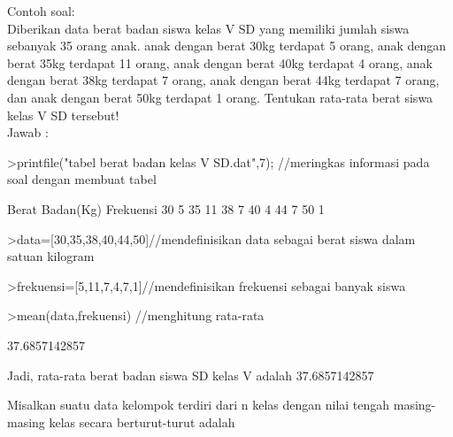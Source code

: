 \documentclass[a4paper,10pt]{article}
\begin{document}
\begin{eulernotebook}
\begin{eulercomment}
\begin{eulercomment}
\begin{eulercomment}
\begin{eulercomment}
\begin{eulercomment}
\begin{eulercomment}
\begin{eulercomment}
\begin{eulercomment}
\begin{eulercomment}
\begin{eulercomment}
\begin{eulercomment}
\begin{eulercomment}
\begin{eulercomment}
Contoh soal:\\
Diberikan data berat badan siswa kelas V SD yang memiliki jumlah siswa
sebanyak 35 orang anak. anak dengan berat 30kg terdapat 5 orang, anak
dengan berat 35kg terdapat 11 orang, anak dengan berat 40kg terdapat 4
orang, anak dengan berat 38kg terdapat 7 orang, anak dengan berat 44kg
terdapat 7 orang, dan anak dengan berat 50kg terdapat 1 orang.
Tentukan rata-rata berat siswa kelas V SD tersebut!\\
Jawab :
\end{eulercomment}
\begin{eulerprompt}
>printfile("tabel berat badan kelas V SD.dat",7); //meringkas informasi pada soal dengan membuat tabel
\end{eulerprompt}
\begin{euleroutput}
  Berat Badan(Kg) Frekuensi
        30            5
        35            11
        38            7
        40            4
        44            7
        50            1
\end{euleroutput}
\begin{eulerprompt}
>data=[30,35,38,40,44,50]//mendefinisikan data sebagai berat siswa dalam satuan kilogram
\end{eulerprompt}
\begin{euleroutput}
  [30,  35,  38,  40,  44,  50]
\end{euleroutput}
\begin{eulerprompt}
>frekuensi=[5,11,7,4,7,1]//mendefinisikan frekuensi sebagai banyak siswa
\end{eulerprompt}
\begin{euleroutput}
  [5,  11,  7,  4,  7,  1]
\end{euleroutput}
\begin{eulerprompt}
>mean(data,frekuensi) //menghitung rata-rata
\end{eulerprompt}
\begin{euleroutput}
  37.6857142857
\end{euleroutput}
\begin{eulercomment}
Jadi, rata-rata berat badan siswa SD kelas V adalah 37.6857142857
\end{eulercomment}
\begin{eulercomment}
Misalkan suatu data kelompok terdiri dari n kelas dengan nilai tengah
masing-masing kelas secara berturut-turut adalah\\
\end{eulercomment}
\begin{eulerformula}

\end{eulerformula}
\end{eulercomment}
\end{eulercomment}
\end{eulercomment}
\end{eulercomment}
\end{eulercomment}
\end{eulercomment}
\end{eulercomment}
\end{eulercomment}
\end{eulercomment}
\end{eulercomment}
\end{eulercomment}
\end{eulercomment}
\end{eulernotebook}
\end{document}
